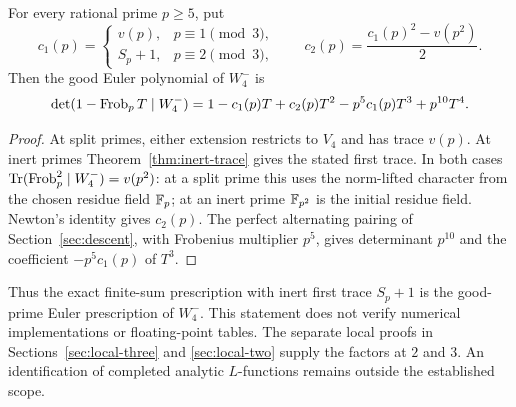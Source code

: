 \begin{corollary}\label{cor:good-euler-factors}
For every rational prime $p\geq5$, put
\[
 c_1(p)=
 \begin{cases}
  v(p),&p\equiv1\pmod3,\\
  S_p+1,&p\equiv2\pmod3,
 \end{cases}
 \qquad
 c_2(p)=\frac{c_1(p)^2-v(p^2)}{2}.
\]
Then the good Euler polynomial of $W_4^-$ is
\begin{equation}\label{eq:good-euler-polynomial}
 \det(1-\operatorname{Frob}_pT\mid W_4^-)
 =1-c_1(p)T+c_2(p)T^2-p^5c_1(p)T^3+p^{10}T^4.
\end{equation}
\end{corollary}

\begin{proof}
At split primes, either extension restricts to $V_4$ and has trace
$v(p)$. At inert primes Theorem~\ref{thm:inert-trace} gives the
stated first trace. In both cases
$\operatorname{Tr}(\operatorname{Frob}_p^2\mid W_4^-)=v(p^2)$: at a split prime this uses
the norm-lifted character from the chosen residue field $\mathbb F_p$;
at an inert prime $\mathbb F_{p^2}$ is the initial residue field.
Newton's identity gives $c_2(p)$. The perfect alternating pairing
of Section~\ref{sec:descent}, with Frobenius multiplier $p^5$,
gives determinant $p^{10}$ and the coefficient $-p^5c_1(p)$
of $T^3$.
\end{proof}

Thus the exact finite-sum prescription with inert first trace $S_p+1$
is the good-prime Euler prescription of $W_4^-$. This statement
does not verify numerical implementations or floating-point tables.
The separate local proofs in Sections~\ref{sec:local-three} and
\ref{sec:local-two} supply the factors at $2$ and $3$. An identification
of completed analytic $L$-functions remains outside the established scope.
